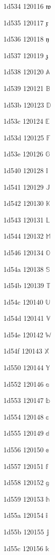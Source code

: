 \documentclass[11pt]{article}
\begin{document}
1d534 120116 \ensuremath{\mathfrak{w}}

1d535 120117 \ensuremath{\mathfrak{x}}

1d536 120118 \ensuremath{\mathfrak{y}}

1d537 120119 \ensuremath{\mathfrak{z}}

1d538 120120 \ensuremath{\mathbb{A}}

1d539 120121 \ensuremath{\mathbb{B}}

1d53b 120123 \ensuremath{\mathbb{D}}

1d53c 120124 \ensuremath{\mathbb{E}}

1d53d 120125 \ensuremath{\mathbb{F}}

1d53e 120126 \ensuremath{\mathbb{G}}

1d540 120128 \ensuremath{\mathbb{I}}

1d541 120129 \ensuremath{\mathbb{J}}

1d542 120130 \ensuremath{\mathbb{K}}

1d543 120131 \ensuremath{\mathbb{L}}

1d544 120132 \ensuremath{\mathbb{M}}

1d546 120134 \ensuremath{\mathbb{O}}

1d54a 120138 \ensuremath{\mathbb{S}}

1d54b 120139 \ensuremath{\mathbb{T}}

1d54c 120140 \ensuremath{\mathbb{U}}

1d54d 120141 \ensuremath{\mathbb{V}}

1d54e 120142 \ensuremath{\mathbb{W}}

1d54f 120143 \ensuremath{\mathbb{X}}

1d550 120144 \ensuremath{\mathbb{Y}}

1d552 120146 \ensuremath{\mathbb{a}}

1d553 120147 \ensuremath{\mathbb{b}}

1d554 120148 \ensuremath{\mathbb{c}}

1d555 120149 \ensuremath{\mathbb{d}}

1d556 120150 \ensuremath{\mathbb{e}}

1d557 120151 \ensuremath{\mathbb{f}}

1d558 120152 \ensuremath{\mathbb{g}}

1d559 120153 \ensuremath{\mathbb{h}}

1d55a 120154 \ensuremath{\mathbb{i}}

1d55b 120155 \ensuremath{\mathbb{j}}

1d55c 120156 \ensuremath{\mathbb{k}}
\end{document}
